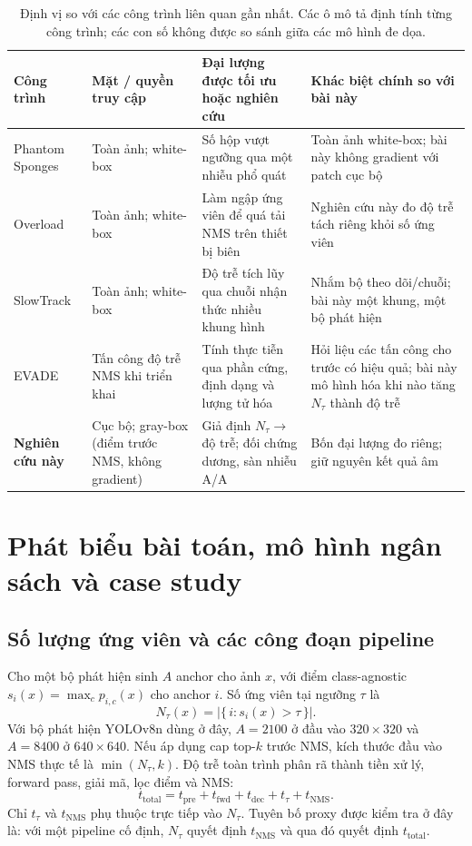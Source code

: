 \documentclass[a4paper,fleqn]{cas-dc}
\newcommand{\Ntau}{N_{\tau}}
\begin{document}
\begin{table}[pos=!t]
\centering\small
\caption{Định vị so với các công trình liên quan gần nhất. Các ô mô tả định tính từng công trình; các con số không được so sánh giữa các mô hình đe dọa.}
\label{tab:related}
\begin{tabularx}{\textwidth}{@{}p{3.2cm}p{3.3cm}p{4.2cm}X@{}}
\toprule
Công trình & Mặt / quyền truy cập & Đại lượng được tối ưu hoặc nghiên cứu & Khác biệt chính so với bài này \\
\midrule
Phantom Sponges \cite{phantom2023} & Toàn ảnh; white-box & Số hộp vượt ngưỡng qua một nhiễu phổ quát & Toàn ảnh white-box; bài này không gradient với patch cục bộ \\
Overload \cite{overload2024} & Toàn ảnh; white-box & Làm ngập ứng viên để quá tải NMS trên thiết bị biên & Nghiên cứu này đo độ trễ tách riêng khỏi số ứng viên \\
SlowTrack \cite{slowtrack2024} & Toàn ảnh; white-box & Độ trễ tích lũy qua chuỗi nhận thức nhiều khung hình & Nhắm bộ theo dõi/chuỗi; bài này một khung, một bộ phát hiện \\
EVADE \cite{evade2025} & Tấn công độ trễ NMS khi triển khai & Tính thực tiễn qua phần cứng, định dạng và lượng tử hóa & Hỏi liệu các tấn công cho trước có hiệu quả; bài này mô hình hóa khi nào tăng $\Ntau$ thành độ trễ \\
\textbf{Nghiên cứu này} & Cục bộ; gray-box (điểm trước NMS, không gradient) & Giả định $\Ntau \to$ độ trễ; đối chứng dương, sàn nhiễu A/A & Bốn đại lượng đo riêng; giữ nguyên kết quả âm \\
\bottomrule
\end{tabularx}
\end{table}

\section{Phát biểu bài toán, mô hình ngân sách và case study}
\label{sec:formal}
\subsection{Số lượng ứng viên và các công đoạn pipeline}
Cho một bộ phát hiện sinh $A$ anchor cho ảnh $x$, với điểm class-agnostic $s_i(x)=\max_c p_{i,c}(x)$ cho anchor $i$. Số ứng viên tại ngưỡng $\tau$ là
\begin{equation}
\Ntau(x)=\bigl|\{\, i : s_i(x) > \tau \,\}\bigr| .
\end{equation}
Với bộ phát hiện YOLOv8n dùng ở đây, $A=2100$ ở đầu vào $320\times320$ và $A=8400$ ở $640\times640$. Nếu áp dụng cap top-$k$ trước NMS, kích thước đầu vào NMS thực tế là $\min(\Ntau,k)$. Độ trễ toàn trình phân rã thành tiền xử lý, forward pass, giải mã, lọc điểm và NMS:
\begin{equation}
t_{\mathrm{total}} = t_{\mathrm{pre}} + t_{\mathrm{fwd}} + t_{\mathrm{dec}} + t_{\tau} + t_{\mathrm{NMS}} .
\end{equation}
Chỉ $t_{\tau}$ và $t_{\mathrm{NMS}}$ phụ thuộc trực tiếp vào $\Ntau$. Tuyên bố proxy được kiểm tra ở đây là: với một pipeline cố định, $\Ntau$ quyết định $t_{\mathrm{NMS}}$ và qua đó quyết định $t_{\mathrm{total}}$.
\end{document}
